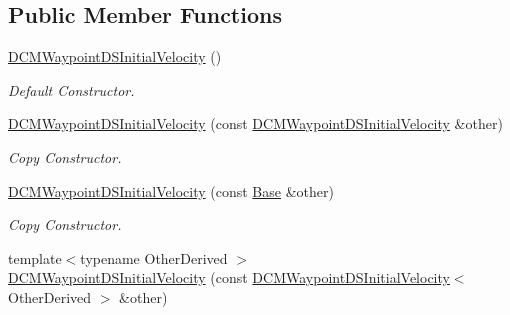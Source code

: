 \subsection*{Public Member Functions}
\begin{DoxyCompactItemize}
\item 
\hyperlink{classow__core_1_1DCMWaypointDSInitialVelocity_ae89b047818e3d8cd5dad2b3897808396}{D\+C\+M\+Waypoint\+D\+S\+Initial\+Velocity} ()\hypertarget{classow__core_1_1DCMWaypointDSInitialVelocity_ae89b047818e3d8cd5dad2b3897808396}{}\label{classow__core_1_1DCMWaypointDSInitialVelocity_ae89b047818e3d8cd5dad2b3897808396}

\begin{DoxyCompactList}\small\item\em Default Constructor. \end{DoxyCompactList}\item 
\hyperlink{classow__core_1_1DCMWaypointDSInitialVelocity_addfea236667f1cb9b4a3603d7623844f}{D\+C\+M\+Waypoint\+D\+S\+Initial\+Velocity} (const \hyperlink{classow__core_1_1DCMWaypointDSInitialVelocity}{D\+C\+M\+Waypoint\+D\+S\+Initial\+Velocity} \&other)\hypertarget{classow__core_1_1DCMWaypointDSInitialVelocity_addfea236667f1cb9b4a3603d7623844f}{}\label{classow__core_1_1DCMWaypointDSInitialVelocity_addfea236667f1cb9b4a3603d7623844f}

\begin{DoxyCompactList}\small\item\em Copy Constructor. \end{DoxyCompactList}\item 
\hyperlink{classow__core_1_1DCMWaypointDSInitialVelocity_a011ae199a97c7669dd89e5b3c3787d50}{D\+C\+M\+Waypoint\+D\+S\+Initial\+Velocity} (const \hyperlink{classow__core_1_1LinearVelocity}{Base} \&other)\hypertarget{classow__core_1_1DCMWaypointDSInitialVelocity_a011ae199a97c7669dd89e5b3c3787d50}{}\label{classow__core_1_1DCMWaypointDSInitialVelocity_a011ae199a97c7669dd89e5b3c3787d50}

\begin{DoxyCompactList}\small\item\em Copy Constructor. \end{DoxyCompactList}\item 
{\footnotesize template$<$typename Other\+Derived $>$ }\\\hyperlink{classow__core_1_1DCMWaypointDSInitialVelocity_aa632f04feef453e88890b433c4f254d1}{D\+C\+M\+Waypoint\+D\+S\+Initial\+Velocity} (const \hyperlink{classow__core_1_1DCMWaypointDSInitialVelocity}{D\+C\+M\+Waypoint\+D\+S\+Initial\+Velocity}$<$ Other\+Derived $>$ \&other)\hypertarget{classow__core_1_1DCMWaypointDSInitialVelocity_aa632f04feef453e88890b433c4f254d1}{}\label{classow__core_1_1DCMWaypointDSInitialVelocity_aa632f04feef453e88890b433c4f254d1}


\end{DoxyCompactItemize}
